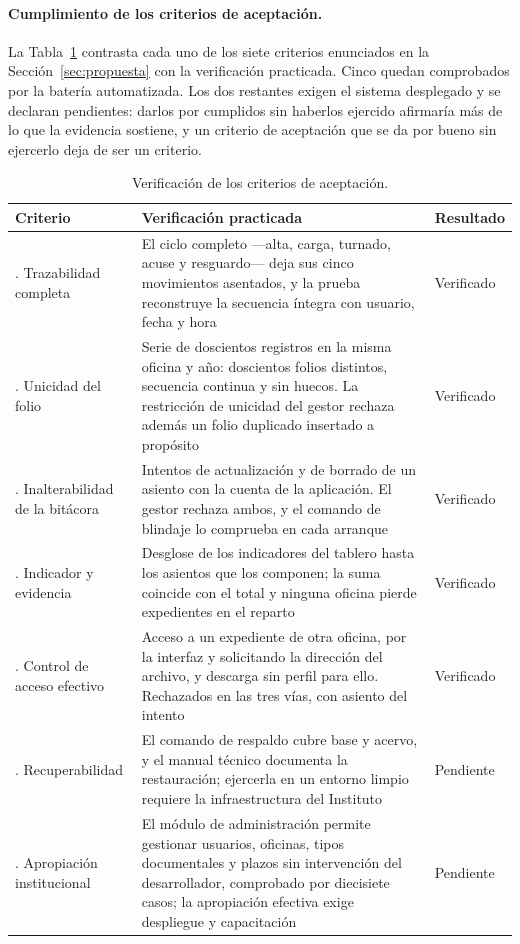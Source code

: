 \paragraph{Cumplimiento de los criterios de aceptación.}
La Tabla~\ref{tab:resultados_criterios} contrasta cada uno de los siete criterios enunciados en la Sección~\ref{sec:propuesta} con la verificación practicada. Cinco quedan comprobados por la batería automatizada. Los dos restantes exigen el sistema desplegado y se declaran pendientes: darlos por cumplidos sin haberlos ejercido afirmaría más de lo que la evidencia sostiene, y un criterio de aceptación que se da por bueno sin ejercerlo deja de ser un criterio.

\begin{table}[H]
  \centering
  \small
  \renewcommand{\arraystretch}{1.3}
  \caption{Verificación de los criterios de aceptación.}
  \label{tab:resultados_criterios}
  \begin{tabularx}{\textwidth}{@{}>{\raggedright\arraybackslash}p{3.2cm}>{\raggedright\arraybackslash}X>{\raggedright\arraybackslash}p{2.0cm}@{}}
    \toprule
    \textbf{Criterio} & \textbf{Verificación practicada} & \textbf{Resultado} \\
    \midrule
    1. Trazabilidad completa & El ciclo completo —alta, carga, turnado, acuse y resguardo— deja sus cinco movimientos asentados, y la prueba reconstruye la secuencia íntegra con usuario, fecha y hora & Verificado \\
    2. Unicidad del folio & Serie de doscientos registros en la misma oficina y año: doscientos folios distintos, secuencia continua y sin huecos. La restricción de unicidad del gestor rechaza además un folio duplicado insertado a propósito & Verificado \\
    3. Inalterabilidad de la bitácora & Intentos de actualización y de borrado de un asiento con la cuenta de la aplicación. El gestor rechaza ambos, y el comando de blindaje lo comprueba en cada arranque & Verificado \\
    4. Indicador y evidencia & Desglose de los indicadores del tablero hasta los asientos que los componen; la suma coincide con el total y ninguna oficina pierde expedientes en el reparto & Verificado \\
    5. Control de acceso efectivo & Acceso a un expediente de otra oficina, por la interfaz y solicitando la dirección del archivo, y descarga sin perfil para ello. Rechazados en las tres vías, con asiento del intento & Verificado \\
    6. Recuperabilidad & El comando de respaldo cubre base y acervo, y el manual técnico documenta la restauración; ejercerla en un entorno limpio requiere la infraestructura del Instituto & Pendiente \\
    7. Apropiación institucional & El módulo de administración permite gestionar usuarios, oficinas, tipos documentales y plazos sin intervención del desarrollador, comprobado por diecisiete casos; la apropiación efectiva exige despliegue y capacitación & Pendiente \\
    \bottomrule
  \end{tabularx}
\end{table}

